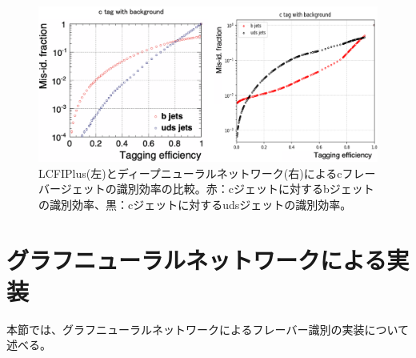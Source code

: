 \begin{figure}[H]
	\begin{center}
 \includegraphics[keepaspectratio, scale=0.3]
 	{Figure/Flavortagging/dnneff_c.png}
 		\caption{LCFIPlus(左)とディープニューラルネットワーク(右)によるcフレーバージェットの識別効率の比較。赤：cジェットに対するbジェットの識別効率、黒：cジェットに対するudsジェットの識別効率。}
 		\label{dnneff_c}
	\end{center}
\end{figure}

\section{グラフニューラルネットワークによる実装}
本節では、グラフニューラルネットワークによるフレーバー識別の実装について述べる。
